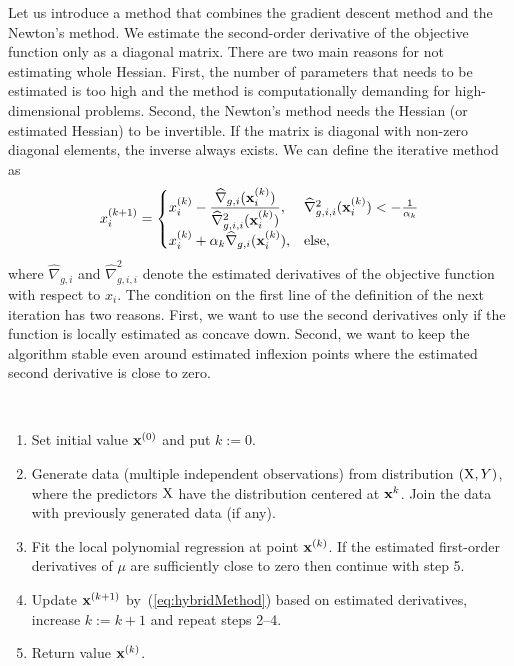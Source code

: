 Let us introduce a method that combines the gradient descent method and the Newton's method. We estimate the second-order derivative of the objective function only as a diagonal matrix. There are two main reasons for not estimating whole Hessian. First, the number of parameters that needs to be estimated is too high and the method is computationally demanding for high-dimensional problems. Second, the Newton's method needs the Hessian (or estimated Hessian) to be invertible. If the matrix is diagonal with non-zero diagonal elements, the inverse always exists. We can define the iterative method as
\begin{equation}
	\label{eq:hybridMethod}
	x^{(k+1)}_i =
		\begin{cases}
			x^{(k)}_i - \displaystyle{\frac {\widehat{\nabla}_{g,i} (\mathbf{x}^{(k)}_i)} {\widehat{\nabla}^2_{g,i,i} (\mathbf{x}^{(k)}_i)}},  & \widehat{\nabla}^2_{g,i,i} (\mathbf{x}^{(k)}_i) < -\frac{1}{\alpha_k} \\
			x^{(k)}_i + \alpha_k \widehat{\nabla}_{g,i} (\mathbf{x}^{(k)}_i), & \text{else,}
		\end{cases}
\end{equation}
where $\widehat{\nabla}_{g,i}$ and $\widehat{\nabla}^2_{g,i,i}$ denote the estimated derivatives of the objective function with respect to $x_i$. The condition on the first line of the definition of the next iteration has two reasons. First, we want to use the second derivatives only if the function is locally estimated as concave down. Second, we want to keep the algorithm stable even around estimated inflexion points where the estimated second derivative is close to zero.

\begin{algorithm}\
	\label{algo:stochApprox}
	\begin{enumerate}
		\item Set initial value $\mathbf{x}^{(0)}$ and put $k := 0$.
		\item Generate data (multiple independent observations) from distribution $(\operatorname{\bm{X}}, Y)$, where the predictors $\operatorname{\bm{X}}$ have the distribution centered at $\mathbf{x}^k$. Join the data with previously generated data (if any).
		\item Fit the local polynomial regression at point $\mathbf{x}^{(k)}$. If the estimated first-order derivatives of $\mu$ are sufficiently close to zero then continue with step 5.
		\item Update $\mathbf{x}^{(k+1)}$ by~(\ref{eq:hybridMethod}) based on estimated derivatives, increase $k := k+1$ and repeat steps 2--4.
		\item Return value $\mathbf{x}^{(k)}$.
	\end{enumerate}
\end{algorithm}

